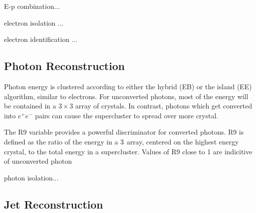 E-p combination...

electron isolation ...
 
electron identification ...

\subsection{Photon Reconstruction}
\label{sec:photonRECO}

Photon energy is clustered according to either the hybrid (EB) or the 
island (EE) algorithm, similar to electrons.  For unconverted photons,
most of the energy will be contained in a $3\times3$ array of crystals.
In contrast, photons which get converted into $e^+e^-$ pairs can 
cause the supercluster to spread over more crystal.  

The R9 variable provides a powerful discriminator for converted photons.
R9 is defined as the ratio of the energy in a $3\time3$ array, centered 
on the highest energy crystal, to the total energy in a supercluster.
Values of R9 close to 1 are indicitive of unconverted photon

photon isolation...

\subsection{Jet Reconstruction}
\label{sec:jetRECO}

